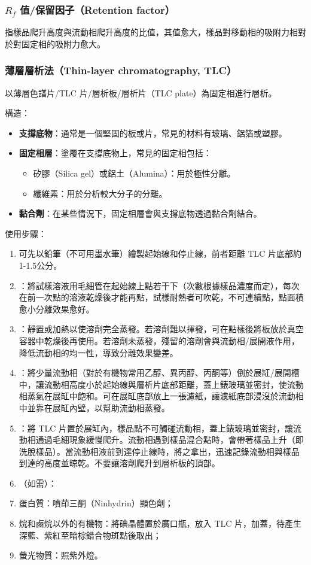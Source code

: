 \documentclass[a4paper,12pt]{article}
\begin{document}
\begin{itemize}
\subsubsection{$R_f$ 值/保留因子（Retention factor）}
指樣品爬升高度與流動相爬升高度的比值，其值愈大，樣品對移動相的吸附力相對於對固定相的吸附力愈大。
\subsubsection{薄層層析法（Thin-layer chromatography, TLC）}
以薄層色譜片/TLC 片/層析板/層析片（TLC plate）為固定相進行層析。

構造：
\begin{itemize}
\item \textbf{支撐底物}：通常是一個堅固的板或片，常見的材料有玻璃、鋁箔或塑膠。
\item \textbf{固定相層}：塗覆在支撐底物上，常見的固定相包括：
\begin{itemize}
\item 矽膠（Silica gel）或鋁土（Alumina）：用於極性分離。
\item 纖維素：用於分析較大分子的分離。
\end{itemize}
\item \textbf{黏合劑}：在某些情況下，固定相層會與支撐底物透過黏合劑結合。
\end{itemize}

使用步驟：
\begin{enumerate}
\item 可先以鉛筆（不可用墨水筆）繪製起始線和停止線，前者距離 TLC 片底部約1-1.5公分。
\item {}：將試樣溶液用毛細管在起始線上點若干下（次數根據樣品濃度而定），每次在前一次點的溶液乾燥後才能再點，試樣耐熱者可吹乾，不可連續點，點面積愈小分離效果愈好。
\item {}：靜置或加熱以使溶劑完全蒸發。若溶劑難以揮發，可在點樣後將板放於真空容器中乾燥後再使用。若溶劑未蒸發，殘留的溶劑會與流動相/展開液作用，降低流動相的均一性，導致分離效果變差。
\item {}：將少量流動相（對於有機物常用乙醇、異丙醇、丙酮等）倒於展缸/展開槽中，讓流動相高度小於起始線與層析片底部距離，蓋上錶玻璃並密封，使流動相蒸氣在展缸中飽和。可在展缸底部放上一張濾紙，讓濾紙底部浸沒於流動相中並靠在展缸內壁，以幫助流動相蒸發。
\item {}：將 TLC 片置於展缸內，樣品點不可觸碰流動相，蓋上錶玻璃並密封，讓流動相通過毛細現象緩慢爬升。流動相遇到樣品混合點時，會帶著樣品上升（即洗脫樣品）。當流動相液前到達停止線時，將之拿出，迅速記錄流動相與樣品到達的高度並晾乾。不要讓溶劑爬升到層析板的頂部。
\item {}（如需）：
\bit
\item 蛋白質：噴茚三酮（Ninhydrin）顯色劑；
\item 烷和鹵烷以外的有機物：將碘晶體置於廣口瓶，放入 TLC 片，加蓋，待產生深藍、紫紅至暗棕錯合物斑點後取出；
\item 螢光物質：照紫外燈。
\eit
\end{enumerate}

\end{itemize}
\end{document}
